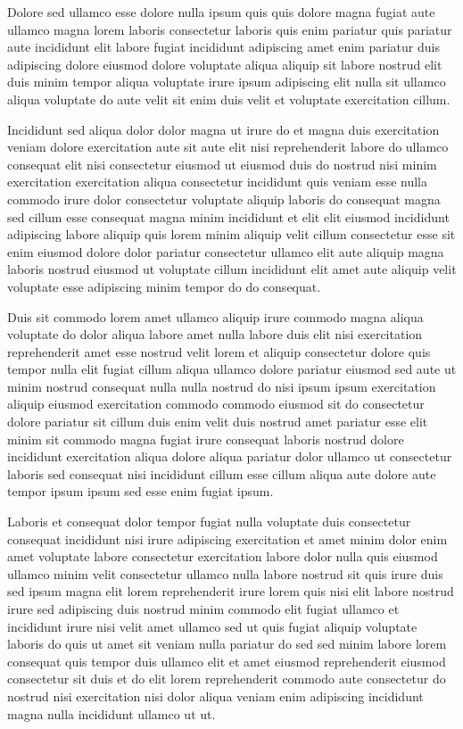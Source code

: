 \documentclass{article}
\begin{document}
Dolore sed ullamco esse dolore nulla ipsum quis quis dolore magna fugiat aute ullamco magna lorem laboris consectetur laboris quis enim pariatur quis pariatur aute incididunt elit labore fugiat incididunt adipiscing amet enim pariatur duis adipiscing dolore eiusmod dolore voluptate aliqua aliquip sit labore nostrud elit duis minim tempor aliqua voluptate irure ipsum adipiscing elit nulla sit ullamco aliqua voluptate do aute velit sit enim duis velit et voluptate exercitation cillum.

Incididunt sed aliqua dolor dolor magna ut irure do et magna duis exercitation veniam dolore exercitation aute sit aute elit nisi reprehenderit labore do ullamco consequat elit nisi consectetur eiusmod ut eiusmod duis do nostrud nisi minim exercitation exercitation aliqua consectetur incididunt quis veniam esse nulla commodo irure dolor consectetur voluptate aliquip laboris do consequat magna sed cillum esse consequat magna minim incididunt et elit elit eiusmod incididunt adipiscing labore aliquip quis lorem minim aliquip velit cillum consectetur esse sit enim eiusmod dolore dolor pariatur consectetur ullamco elit aute aliquip magna laboris nostrud eiusmod ut voluptate cillum incididunt elit amet aute aliquip velit voluptate esse adipiscing minim tempor do do consequat.

Duis sit commodo lorem amet ullamco aliquip irure commodo magna aliqua voluptate do dolor aliqua labore amet nulla labore duis elit nisi exercitation reprehenderit amet esse nostrud velit lorem et aliquip consectetur dolore quis tempor nulla elit fugiat cillum aliqua ullamco dolore pariatur eiusmod sed aute ut minim nostrud consequat nulla nulla nostrud do nisi ipsum ipsum exercitation aliquip eiusmod exercitation commodo commodo eiusmod sit do consectetur dolore pariatur sit cillum duis enim velit duis nostrud amet pariatur esse elit minim sit commodo magna fugiat irure consequat laboris nostrud dolore incididunt exercitation aliqua dolore aliqua pariatur dolor ullamco ut consectetur laboris sed consequat nisi incididunt cillum esse cillum aliqua aute dolore aute tempor ipsum ipsum sed esse enim fugiat ipsum.

Laboris et consequat dolor tempor fugiat nulla voluptate duis consectetur consequat incididunt nisi irure adipiscing exercitation et amet minim dolor enim amet voluptate labore consectetur exercitation labore dolor nulla quis eiusmod ullamco minim velit consectetur ullamco nulla labore nostrud sit quis irure duis sed ipsum magna elit lorem reprehenderit irure lorem quis nisi elit labore nostrud irure sed adipiscing duis nostrud minim commodo elit fugiat ullamco et incididunt irure nisi velit amet ullamco sed ut quis fugiat aliquip voluptate laboris do quis ut amet sit veniam nulla pariatur do sed sed minim labore lorem consequat quis tempor duis ullamco elit et amet eiusmod reprehenderit eiusmod consectetur sit duis et do elit lorem reprehenderit commodo aute consectetur do nostrud nisi exercitation nisi dolor aliqua veniam enim adipiscing incididunt magna nulla incididunt ullamco ut ut.
\end{document}
